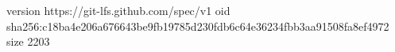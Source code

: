 version https://git-lfs.github.com/spec/v1
oid sha256:c18ba4e206a676643be9fb19785d230fdb6c64e36234fbb3aa91508fa8ef4972
size 2203
